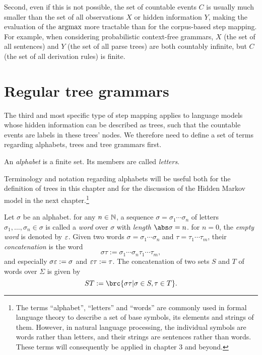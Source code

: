 Second, even if this is not possible, the set of countable events $C$ is
usually much smaller than the set of all observations $X$ or hidden information
$Y$, making the evaluation of the $\argmax$ more tractable than for the
corpus-based step mapping. For example, when considering probabilistic
context-free grammars, $X$ (the set of all sentences) and $Y$ (the set of all
parse trees) are both countably infinite, but $C$ (the set of all derivation
rules) is finite.

\section{Regular tree grammars}

The third and most specific type of step mapping applies to language models
whose hidden information can be described as trees, such that the countable
events are labels in these trees' nodes. We therefore need to define a set of
terms regarding alphabets, trees and tree grammars first.

\begin{definition}
 An \emph{alphabet} is a finite set. Its members are called \emph{letters}.
\end{definition}

Terminology and notation regarding alphabets will be useful both for the
definition of trees in this chapter and for the discussion of the Hidden Markov
model in the next chapter.\footnote{The terms ``alphabet'', ``letters'' and
``words'' are commonly used in formal language theory to describe a set of base
symbols, its elements and strings of them. However, in natural language
processing, the individual symbols are words rather than letters, and their
strings are sentences rather than words. These terms will consequently be
applied in chapter 3 and beyond.}

\begin{definition}
 Let $\sigma$ be an alphabet. for any $n\in\mathbb N$, a sequence $\sigma =
 \sigma_1\cdots\sigma_n$ of letters $\sigma_1,\ldots,\sigma_n\in\sigma$ is
 called a \emph{word} over $\sigma$ with \emph{length} $\abs\sigma = n$. for
 $n=0$, the \emph{empty word} is denoted by $\varepsilon$. Given two words
 $\sigma=\sigma_1\cdots\sigma_n$ and $\tau=\tau_1\cdots\tau_m$, their
 \emph{concatenation} is the word
 \[
  \sigma\tau := \sigma_1\cdots\sigma_n\tau_1\cdots\tau_m,
 \]
 and especially $\sigma\varepsilon := \sigma$ and $\varepsilon\tau := \tau$. The
 concatenation of two sets $S$ and $T$ of words over $\Sigma$ is given by
 \[
  ST := \brc{\sigma\tau|\sigma\in S, \tau\in T}.
 \]
\end{definition}

